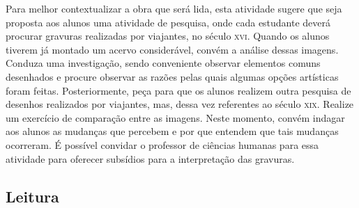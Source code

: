 \documentclass[12pt]{extarticle}
\begin{document}
Para melhor contextualizar a obra que será lida, esta
atividade sugere que seja proposta aos alunos uma atividade de pesquisa,
onde cada estudante deverá procurar gravuras realizadas por viajantes,
no século \textsc{xvi}. Quando os alunos tiverem já montado um acervo
considerável, convém a análise dessas imagens. Conduza uma investigação,
sendo conveniente observar elementos comuns desenhados e procure
observar as razões pelas quais algumas opções artísticas foram feitas.
Posteriormente, peça para que os alunos realizem outra pesquisa de
desenhos realizados por viajantes, mas, dessa vez referentes ao século
\textsc{xix}. Realize um exercício de comparação entre as imagens. Neste momento,
convém indagar aos alunos as mudanças que percebem e por que entendem
que tais mudanças ocorreram. É possível convidar o professor de ciências
humanas para essa atividade para oferecer subsídios para a interpretação
das gravuras.

\subsection{Leitura}

\end{document}
